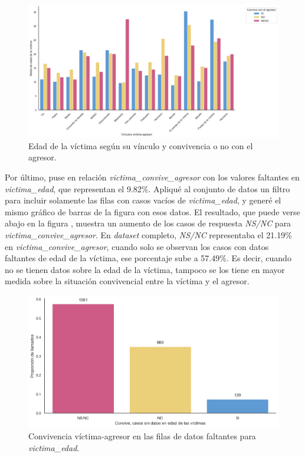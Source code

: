 \documentclass[10 pt]{article}
\begin{document}
\begin{figure}[H]
    \begin{center}
    \includegraphics[scale=.5]{images/convive_edad_agresor.png}
    \caption{Edad de la víctima según su vínculo y convivencia o no con el agresor.}
    \label{edadconvagr}
    \end{center}
    \end{figure}


Por último, puse en relación \textit{victima\_convive\_agresor} con los valores faltantes en \textit{victima\_edad}, que representan el 9.82\%. Apliqué al conjunto de datos un filtro para incluir solamente las filas con casos vacíos de \textit{victima\_edad}, y generé el mismo gráfico de barras de la figura  con esos datos. El resultado, que puede verse abajo en la figura , muestra un aumento de los casos de respuesta \textit{NS/NC} para \textit{victima\_convive\_agresor}. En \textit{dataset} completo, \textit{NS/NC} representaba el 21.19\% en \textit{victima\_convive\_agresor}, cuando solo se observan los casos con datos faltantes de edad de la víctima, ese porcentaje sube a 57.49\%. Es decir, cuando no se tienen datos sobre la edad de la víctima, tampoco se los tiene en mayor medida sobre la situación convivencial entre la víctima y el agresor.

\begin{figure}[H]
    \begin{center}
    \includegraphics[scale=.5]{images/latex_convive_sd_edad_vic.png}
    \caption{Convivencia víctima-agresor en las filas de datos faltantes para \textit{victima\_edad}.}
    \label{conviveedadfaltantevic}
    \end{center}
    \end{figure}
\end{document}
